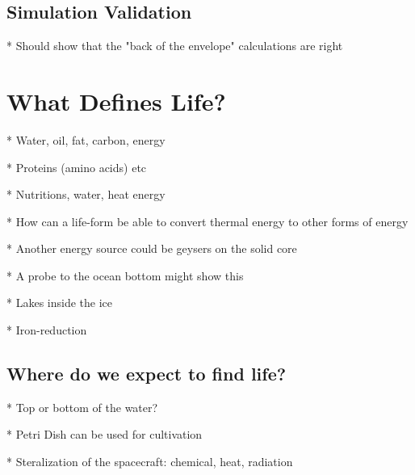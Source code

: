 \subsection{Simulation Validation}

* Should show that the "back of the envelope" calculations are right

\section{What Defines Life?} %

* Water, oil, fat, carbon, energy

* Proteins (amino acids) etc

* Nutritions, water, heat energy

* How can a life-form be able to convert thermal energy to other forms of energy

* Another energy source could be geysers on the solid core

    * A probe to the ocean bottom might show this
    
* Lakes inside the ice

* Iron-reduction

\subsection{Where do we expect to find life?}

* Top or bottom of the water?

* Petri Dish can be used for cultivation

* Steralization of the spacecraft: chemical, heat, radiation
